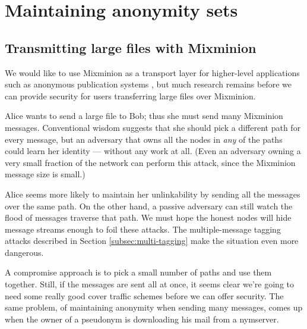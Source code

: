 \documentclass[11pt]{IEEEtran}
\begin{document}

\section{Maintaining anonymity sets}
\label{sec:maintaining-anonymity}

\subsection{Transmitting large files with Mixminion}

We would like to use Mixminion as a transport layer for higher-level
applications such as anonymous publication systems
\cite{freehaven-berk}, but much research remains before we can
provide security for users transferring large files over Mixminion.

Alice wants to send a large file to Bob; thus she must send many Mixminion
messages. Conventional wisdom suggests that she should pick a different
path for every message, but an adversary that owns all the nodes in
\emph{any} of the paths could learn her identity --- without any work
at all. (Even an adversary owning a very small fraction of the network
can perform this attack, since the Mixminion message size is small.)


Alice seems more likely to maintain her unlinkability by sending all the
messages over the same path. On the other hand, a passive adversary can
still watch the flood of messages traverse that path. We must hope the
honest nodes will hide message streams enough to
foil these attacks. The multiple-message tagging attacks described in
Section \ref{subsec:multi-tagging} make the situation even more dangerous.

A compromise approach is to pick a small number of paths and use them
together. Still, if the messages are sent all at once, it seems clear
we're going to need some really good cover traffic schemes before we
can offer security. The same problem, of maintaining anonymity when
sending many messages, comes up when the owner of a pseudonym
is downloading his mail from a nymserver.
\end{document}
